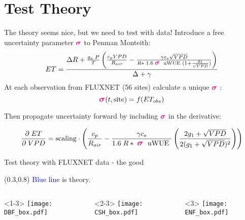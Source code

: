 \documentclass[aspectratio=169]{beamer}
\begin{document}
\section{Test Theory}
\begin{frame}{The theory seems nice, but we need to test with data!}
  Introduce a free uncertainty parameter \Large $\textcolor{magenta}{\boldsymbol{\sigma}}$ \normalsize to Penman Monteith:
  \[ET = \frac{\Delta R + \frac{g_a\; P}{T} \left( \frac{ c_p VPD}{R_{air}} -  \frac{\gamma c_s \sqrt{VPD} }{ R* \; 1.6\; \textcolor{magenta}{\boldsymbol{\mathlarger{\mathlarger{\sigma}}}} \; \text{ uWUE } (1 + \frac{g_1}{\sqrt{VPD}})} \right) }{ \Delta + \gamma}\]
  At each observation from FLUXNET (56 sites) calculate a unique \Large $\textcolor{magenta}{\boldsymbol{\sigma}}$ \normalsize:
  \[\textcolor{magenta}{\boldsymbol{\mathlarger{\sigma}}}(t, \text{site}) = f(ET_{obs})\]

  Then propagate uncertainty forward by including \Large $\textcolor{magenta}{\boldsymbol{\sigma}}$ \normalsize in the derivative:

  \[\frac{\partial \;  ET}{\partial \; VPD} = \text{scaling} \cdot \left(\frac{ c_p}{R_{air}} -  \frac{\gamma c_s }{1.6 \; R*\; \textcolor{magenta}{\boldsymbol{\mathlarger{\mathlarger{\sigma}}}} \; \text{ uWUE }} \left( \frac{2 g_1 + \sqrt{VPD}}{2 (g_1 + \sqrt{VPD})^2}\right) \right)\]
\end{frame}

\begin{frame}{Test theory with FLUXNET data - the good}
  \begin{textblock*}{1.0\textwidth}(0.3\textwidth,0.8\textheight)
    \textcolor{blue}{Blue line} is theory.\\
  \end{textblock*}

  \begin{columns}
    \begin{column}{0.33\textwidth}<1-3>
      \texttt{[image: DBF\_box.pdf]}
    \end{column}
    \begin{column}{0.33\textwidth}<2-3>
      \texttt{[image: CSH\_box.pdf]}
    \end{column}
    \begin{column}{0.33\textwidth}<3>
      \texttt{[image: ENF\_box.pdf]}
    \end{column}
  \end{columns}
\end{frame}
\end{document}
